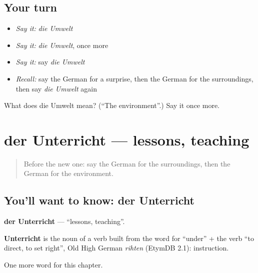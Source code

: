 \subsection*{Your turn}
\begin{itemize}
\raggedright
  \item \emph{Say it:} \emph{die Umwelt}
  \item \emph{Say it:} \emph{die Umwelt}, once more
  \item \emph{Say it:} say \emph{die Umwelt}
  \item \emph{Recall:} say the German for a surprise, then the German for the surroundings, then say \emph{die Umwelt} again
\end{itemize}

\begin{tcolorbox}[breakable,colback=teal!4,colframe=teal!35!black,title={Before you move on}]
What does die Umwelt mean? (\textquotedblleft{}The environment\textquotedblright{}.) Say it once more.
\end{tcolorbox}
\section[der Unterricht]{der Unterricht — lessons, teaching}

\label{lesson:GE-C241-unterricht}



\begin{quote}
Before the new one: say the German for the surroundings, then the German for the environment.
\end{quote}

\subsection*{You'll want to know: der Unterricht}
\textbf{der Unterricht} — \textquotedblleft{}lessons, teaching\textquotedblright{}.

\begin{cousinweb}
\textbf{Unterricht} is the noun of a verb built from the word for \textquotedblleft{}under\textquotedblright{} + the verb \textquotedblleft{}to direct, to set right\textquotedblright{}, Old High German \emph{rihten} (EtymDB 2.1): instruction.
\end{cousinweb}

\begin{grammarlens}[title={What you've built}]
One more word for this chapter.
\end{grammarlens}

